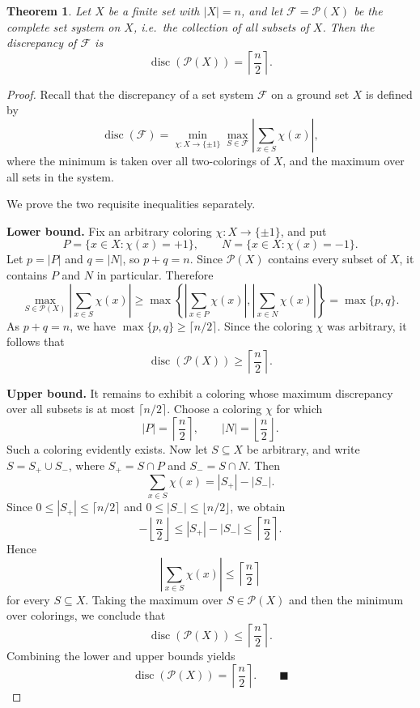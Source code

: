 \documentclass[11pt]{article}
\newtheorem{theorem}{Theorem}
\begin{document}
\begin{theorem}
Let \(X\) be a finite set with \(|X| = n\), and let \(\mathcal{F} = \mathcal{P}(X)\) be the complete set system on \(X\), i.e.\ the collection of all subsets of \(X\). Then the discrepancy of \(\mathcal{F}\) is
\[
\operatorname{disc}(\mathcal{P}(X)) = \left\lceil \frac{n}{2} \right\rceil.
\]
\end{theorem}

\begin{proof}
Recall that the discrepancy of a set system \(\mathcal{F}\) on a ground set \(X\) is defined by
\[
\operatorname{disc}(\mathcal{F}) = \min_{\chi \colon X \to \{\pm 1\}} \max_{S \in \mathcal{F}} \left| \sum_{x \in S} \chi(x) \right|,
\]
where the minimum is taken over all two-colorings of \(X\), and the maximum over all sets in the system.

We prove the two requisite inequalities separately.

\medskip
\noindent\textbf{Lower bound.}
Fix an arbitrary coloring \(\chi \colon X \to \{\pm 1\}\), and put
\[
P = \{x \in X : \chi(x) = +1\}, \qquad N = \{x \in X : \chi(x) = -1\}.
\]
Let \(p = |P|\) and \(q = |N|\), so \(p + q = n\). Since \(\mathcal{P}(X)\) contains every subset of \(X\), it contains \(P\) and \(N\) in particular. Therefore
\[
\max_{S \in \mathcal{P}(X)} \left| \sum_{x \in S} \chi(x) \right| \ge \max\left\{ \left| \sum_{x \in P} \chi(x) \right|, \left| \sum_{x \in N} \chi(x) \right| \right\} = \max\{p, q\}.
\]
As \(p + q = n\), we have \(\max\{p, q\} \ge \lceil n/2 \rceil\). Since the coloring \(\chi\) was arbitrary, it follows that
\[
\operatorname{disc}(\mathcal{P}(X)) \ge \left\lceil \frac{n}{2} \right\rceil.
\]

\medskip
\noindent\textbf{Upper bound.}
It remains to exhibit a coloring whose maximum discrepancy over all subsets is at most \(\lceil n/2 \rceil\). Choose a coloring \(\chi\) for which
\[
|P| = \left\lceil \frac{n}{2} \right\rceil, \qquad |N| = \left\lfloor \frac{n}{2} \right\rfloor.
\]
Such a coloring evidently exists. Now let \(S \subseteq X\) be arbitrary, and write \(S = S_+ \cup S_-\), where \(S_+ = S \cap P\) and \(S_- = S \cap N\). Then
\[
\sum_{x \in S} \chi(x) = |S_+| - |S_-|.
\]
Since \(0 \le |S_+| \le \lceil n/2 \rceil\) and \(0 \le |S_-| \le \lfloor n/2 \rfloor\), we obtain
\[
-\left\lfloor \frac{n}{2} \right\rfloor \le |S_+| - |S_-| \le \left\lceil \frac{n}{2} \right\rceil.
\]
Hence
\[
\left| \sum_{x \in S} \chi(x) \right| \le \left\lceil \frac{n}{2} \right\rceil
\]
for every \(S \subseteq X\). Taking the maximum over \(S \in \mathcal{P}(X)\) and then the minimum over colorings, we conclude that
\[
\operatorname{disc}(\mathcal{P}(X)) \le \left\lceil \frac{n}{2} \right\rceil.
\]
Combining the lower and upper bounds yields
\[
\operatorname{disc}(\mathcal{P}(X)) = \left\lceil \frac{n}{2} \right\rceil. \qquad \blacksquare
\]
\end{proof}
\end{document}
